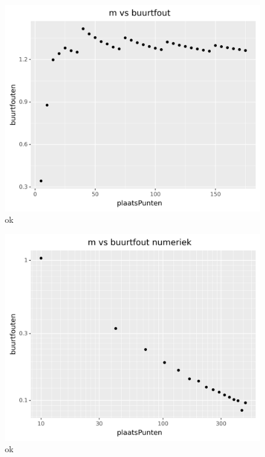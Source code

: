 \documentclass{article}
\begin{document}
\begin{figure}
\includegraphics[width=\linewidth]{oefening8e.png}
\caption{ok}\label{fig:buurte}
\end{figure}

\begin{figure}
\includegraphics[width=\linewidth]{oefening8n.png}
\caption{ok}\label{fig:buurtn}
\end{figure}
\end{document}
